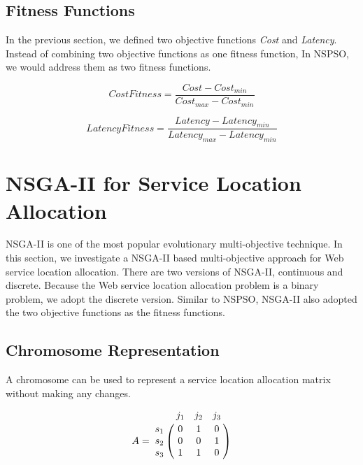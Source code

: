 \subsection{Fitness Functions}
\label{sec:nspsofitness}
In the previous section, we defined two objective functions \emph{Cost} and \emph{Latency}. Instead of 
combining two objective functions as one fitness function, 
In NSPSO, we would address them as two fitness functions.

 \begin{equation}
 	\label{eq:cost_prime}
 	CostFitness = \frac{Cost - Cost_{min}}{Cost_{max} - Cost_{min}}
 \end{equation}
 
 \begin{equation}
 	\label{eq:latency_prime}
 	LatencyFitness = \frac{Latency - Latency_{min}}{Latency_{max} - Latency_{min}}
 \end{equation}



\section{NSGA-II for Service Location Allocation}
NSGA-II is one of the most popular evolutionary multi-objective technique.
In this section, we investigate a NSGA-II based multi-objective approach for Web service location allocation.
There are two versions of NSGA-II, continuous and discrete. Because the Web service location allocation problem is a binary problem, we adopt the 
discrete version.
Similar to NSPSO, NSGA-II also adopted the two objective functions as the fitness functions.


\subsection{Chromosome Representation}
A chromosome can be used to represent a service location allocation matrix without making any changes.

$$
A = \bbordermatrix{~ & j_{1} & j_{2} & j_{3}\cr
					s_{1}	&0 &1 &0	\cr
					s_{2}	&0  &0 &1	\cr
					s_{3}	&1 &1 &0	\cr}
$$



